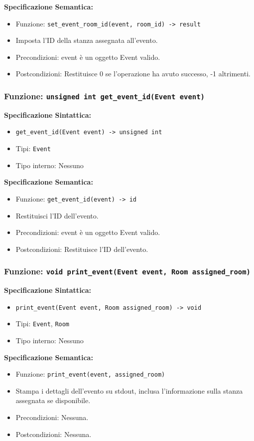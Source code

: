 \documentclass[11pt]{scrartcl} %
\begin{document}
\textbf{Specificazione Semantica:}
\begin{itemize}
\item Funzione: \texttt{set\_event\_room\_id(event, room\_id) -> result}
\item Imposta l'ID della stanza assegnata all'evento.
\item Precondizioni: event è un oggetto Event valido.
\item Postcondizioni: Restituisce 0 se l'operazione ha avuto successo, -1 altrimenti.
\end{itemize}

\subsubsection{Funzione: \texttt{unsigned int get\_event\_id(Event event)}}

\textbf{Specificazione Sintattica:}
\begin{itemize}
\item \texttt{get\_event\_id(Event event) -> unsigned int}
\item Tipi: \texttt{Event}
\item Tipo interno: Nessuno
\end{itemize}

\textbf{Specificazione Semantica:}
\begin{itemize}
\item Funzione: \texttt{get\_event\_id(event) -> id}
\item Restituisci l'ID dell'evento.
\item Precondizioni: event è un oggetto Event valido.
\item Postcondizioni: Restituisce l'ID dell'evento.
\end{itemize}

\subsubsection{Funzione: \texttt{void print\_event(Event event, Room assigned\_room)}}

\textbf{Specificazione Sintattica:}
\begin{itemize}
\item \texttt{print\_event(Event event, Room assigned\_room) -> void}
\item Tipi: \texttt{Event}, \texttt{Room}
\item Tipo interno: Nessuno
\end{itemize}

\textbf{Specificazione Semantica:}
\begin{itemize}
\item Funzione: \texttt{print\_event(event, assigned\_room)}
\item Stampa i dettagli dell'evento su stdout, inclusa l'informazione sulla stanza assegnata se disponibile.
\item Precondizioni: Nessuna.
\item Postcondizioni: Nessuna.
\end{itemize}
\end{document}
